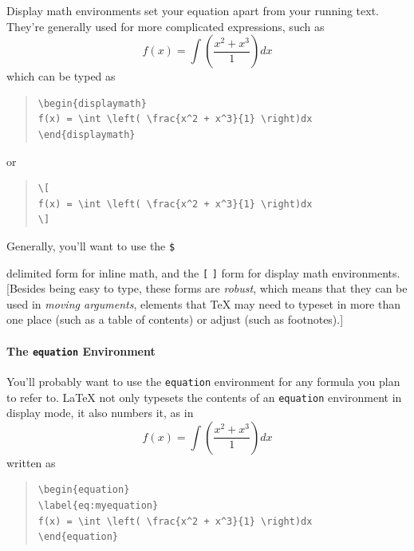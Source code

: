 \documentclass{icmmcm}
\newcommand{\bslash}{\symbol{'134}}%
\newcommand{\bsl}{{\texttt{\bslash}}}
\newcommand{\com}[1]{\bsl\texttt{#1}\xspace}
\newcommand{\key}[1]{\textsf{\emph{#1}}\xspace}
\newcommand{\env}[1]{\texttt{#1}\xspace}
\newcommand{\tex}{\TeX\xspace}
\newcommand{\latex}{\LaTeX\xspace}
\begin{document}
{\begin{quote}
\end{quote}

Display math environments set your equation apart from your running
text.  They're generally used for more complicated expressions, such
as
\[
f(x) = \int \left( \frac{x^2 + x^3}{1} \right)dx
\]
which can be typed as

\begin{quote}
\begin{verbatim}
\begin{displaymath}
f(x) = \int \left( \frac{x^2 + x^3}{1} \right)dx
\end{displaymath}
\end{verbatim}
\end{quote}
or
\begin{quote}
\begin{verbatim}
\[
f(x) = \int \left( \frac{x^2 + x^3}{1} \right)dx
\]
\end{verbatim}
\end{quote}

Generally, you'll want to use the \verb+$+ %

delimited form for inline math, and the \com{[} \com{]} form for
display math environments.  [Besides being easy to type, these forms
are \key{robust}, which means that they can be used in \key{moving
  arguments}, elements that \tex may need to typeset in more than one
place (such as a table of contents) or adjust (such as footnotes).]

\paragraph{The \env{equation} Environment}%
\label{sec:equation-environment}

You'll probably want to use the \env{equation} environment for any
formula you plan to refer to.  \latex not only typesets the contents
of an \env{equation} environment in display mode, it also numbers it,
as in
\begin{equation}
\label{eq:myequation}
f(x) = \int \left( \frac{x^2 + x^3}{1} \right)dx
\end{equation}
written as
\begin{quote}
\begin{verbatim}
\begin{equation}
\label{eq:myequation}
f(x) = \int \left( \frac{x^2 + x^3}{1} \right)dx
\end{equation}
\end{verbatim}
\end{quote}

}
\end{document}
